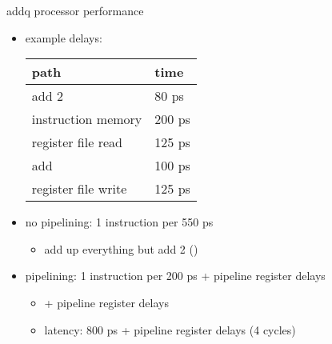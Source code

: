 
\begin{frame}{addq processor performance}
\vspace{-1cm}
\begin{itemize}
\item {\small example delays: \\
\begin{tabular}{ll}
path & time \\ \hline
add 2 & 80 ps \\
instruction memory & 200 ps \\
register file read & 125 ps \\
add & 100 ps \\
register file write & 125 ps \\
\end{tabular}}
\item no pipelining: 1 instruction per 550 ps
    \begin{itemize}
    \item add up everything but add 2 ()
    \end{itemize}
\item pipelining: 1 instruction per 200 ps + pipeline register delays
    \begin{itemize}
    \item {} + pipeline register delays
    \item latency: 800 ps + pipeline register delays (4 cycles)
    \end{itemize}
\end{itemize}
\end{frame}

